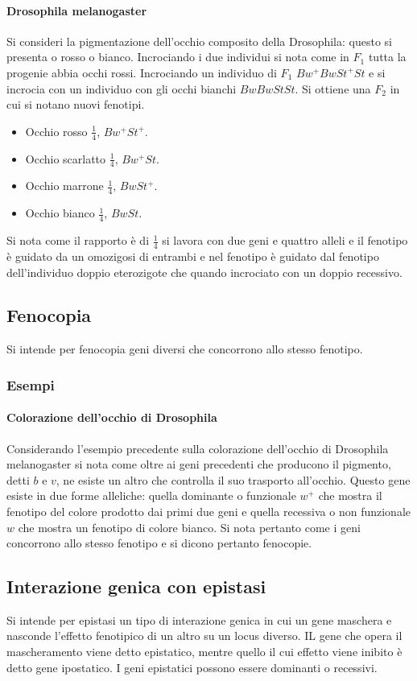 \paragraph{Drosophila melanogaster}
Si consideri la pigmentazione dell'occhio composito della Drosophila: questo si presenta o rosso o bianco. Incrociando i due individui si nota come in $F_1$ tutta la progenie abbia
occhi rossi. Incrociando un individuo di $F_1$ $Bw^+BwSt^+St$ e si incrocia con un individuo con gli occhi bianchi $BwBwStSt$. Si ottiene una $F_2$ in cui si notano nuovi fenotipi. 
\begin{itemize}
	\item Occhio rosso $\frac{1}{4}$, $Bw^+St^+$.
	\item Occhio scarlatto $\frac{1}{4}$, $Bw^+St$.
	\item Occhio marrone $\frac{1}{4}$, $BwSt^+$.
	\item Occhio bianco $\frac{1}{4}$, $BwSt$.
\end{itemize}
Si nota come il rapporto \`e di $\frac{1}{4}$ si lavora con due geni e quattro alleli e il fenotipo \`e guidato da un omozigosi di entrambi e nel fenotipo \`e guidato dal fenotipo 
dell'individuo doppio eterozigote che quando incrociato con un doppio recessivo. 
\subsection{Fenocopia}
Si intende per fenocopia geni diversi che concorrono allo stesso fenotipo.
\subsubsection{Esempi}
\paragraph{Colorazione dell'occhio di Drosophila}
Considerando l'esempio precedente sulla colorazione dell'occhio di Drosophila melanogaster si nota come oltre ai geni precedenti che producono il pigmento, detti $b$ e $v$, ne esiste
un altro che controlla il suo trasporto all'occhio. Questo gene esiste in due forme alleliche: quella dominante o funzionale $w^+$ che mostra il fenotipo del colore prodotto dai primi
due geni e quella recessiva o non funzionale $w$ che mostra un fenotipo di colore bianco. Si nota pertanto come i geni concorrono allo stesso fenotipo e si dicono pertanto fenocopie. 
\subsection{Interazione genica con epistasi}
Si intende per epistasi un tipo di interazione genica in cui un gene maschera e nasconde l'effetto fenotipico di un altro su un locus diverso. IL gene che opera il mascheramento viene detto 
epistatico, mentre quello il cui effetto viene inibito \`e detto gene ipostatico. I geni epistatici possono essere dominanti o recessivi.
